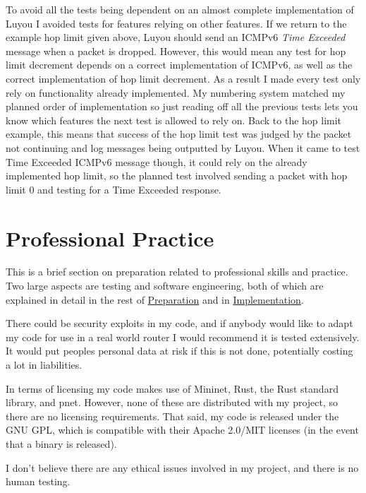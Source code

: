 \documentclass[12pt,a4paper,twoside,openright]{report}
\begin{document}
\bigskip

To avoid all the tests being dependent on an almost complete implementation of Luyou I avoided tests for features relying on other features. If we return to the example hop limit given above, Luyou should send an ICMPv6 \textit{Time Exceeded} message when a packet is dropped.  However, this would mean any test for hop limit decrement depends on a correct implementation of ICMPv6, as well as the correct implementation of hop limit decrement.  As a result I made every test only rely on functionality already implemented.  My numbering system matched my planned order of implementation so just reading off all the previous tests lets you know which features the next test is allowed to rely on.  Back to the hop limit example, this means that success of the hop limit test was judged by the packet not continuing and log messages being outputted by Luyou. When it came to test Time Exceeded ICMPv6 message though, it could rely on the already implemented hop limit, so the planned test involved sending a packet with hop limit 0 and testing for a Time Exceeded response.

\section{Professional Practice}
This is a brief section on preparation related to professional skills and practice.  Two large aspects are testing and software engineering, both of which are explained in detail in the rest of \hyperref[chap::preparation]{Preparation} and in \hyperref[chap::implementation]{Implementation}.  

\bigskip

There could be security exploits in my code, and if anybody would like to adapt my code for use in a real world router I would recommend it is tested extensively.  It would put peoples personal data at risk if this is not done, potentially costing a lot in liabilities.

\bigskip

In terms of licensing my code makes use of Mininet, Rust, the Rust standard library, and pnet.  However, none of these are distributed with my project, so there are no licensing requirements.  That said, my code is released under the GNU GPL\cite{gpl}, which is compatible with their Apache 2.0/MIT licenses (in the event that a binary is released).

\bigskip

I don't believe there are any ethical issues involved in my project, and there is no human testing.
\end{document}
